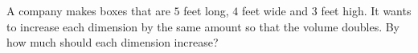 A company makes boxes that are $5$ feet long, $4$ feet wide and $3$ feet high. It wants to increase each dimension by the same amount so that the volume doubles. By how much should each dimension increase?
